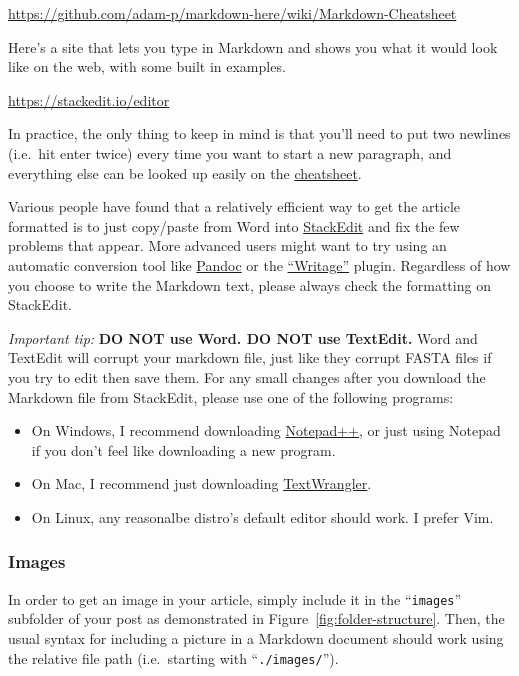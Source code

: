 \documentclass[paper=a4, fontsize=11pt]{scrartcl}
\numberwithin{equation}{section}        %
\numberwithin{figure}{section}            %
\numberwithin{table}{section}                %
\begin{document}
\url{https://github.com/adam-p/markdown-here/wiki/Markdown-Cheatsheet}

Here's a site that lets you type in Markdown and shows you what it would
look like on the web, with some built in examples.

\url{https://stackedit.io/editor}

In practice, the only thing to keep in mind is that you'll need to put
two newlines (i.e.\ hit enter twice) every time you want to start a new
paragraph, and everything else can be looked up easily on the
\href{https://github.com/adam-p/markdown-here/wiki/Markdown-Cheatsheet}{cheatsheet}.

Various people have found
that a relatively efficient way to get the article formatted is to just copy/paste
from Word into \href{https://stackedit.io/editor}{StackEdit} and fix the few problems that appear. More advanced users
might want to try using an automatic conversion tool like
\href{http://pandoc.org/demos.html}{Pandoc} or the
\href{http://www.writage.com/}{``Writage''} plugin. Regardless of how you choose
to write the Markdown text, please always check the formatting on StackEdit.

\textit{Important tip:} \textbf{DO NOT use Word. DO NOT use TextEdit.}
Word and TextEdit will corrupt your markdown file, just like they corrupt FASTA
files if you try to edit then save them. For any small changes after you
download the Markdown file from StackEdit, please use one of the following
programs:
\begin{itemize}
    \item On Windows, I
recommend downloading \href{https://notepad-plus-plus.org/}{Notepad++},
or just using Notepad if you don't feel like downloading a new program.
    \item On Mac, I recommend just downloading
\href{https://itunes.apple.com/us/app/textwrangler/id404010395?mt=12}{TextWrangler}.
    \item On Linux, any reasonalbe distro's default editor should work. I prefer
Vim.
\end{itemize}

\subsubsection{Images}\label{sec:image-links}
In order to get an image in your article, simply include it in the
``\texttt{images}'' subfolder of your post as demonstrated in
Figure~\ref{fig:folder-structure}. Then, the usual syntax for including a
picture in a Markdown document should work using the relative file path
(i.e.\ starting with ``\texttt{./images/}'').
\end{document}
